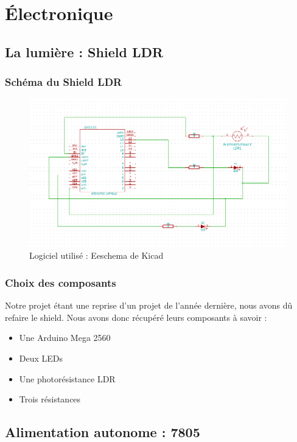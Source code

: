 \chapter{Électronique}
\section{La lumière : Shield LDR}
\subsection{Schéma du Shield LDR}
\begin{figure}[h]
	\centering
	\includegraphics[width=550px]{images/SchemaElectriqueShield.png}
	\caption{Logiciel utilisé : Eeschema de Kicad}
\end{figure}

\subsection{Choix des composants} 
	Notre projet étant une reprise d'un projet de l'année dernière, nous avons dû refaire le shield. Nous avons donc récupéré leurs composants à savoir :
	\begin{itemize}
		\item Une Arduino Mega 2560
		\item Deux LEDs 
		\item Une photorésistance LDR
		\item Trois résistances
	\end{itemize}

\section{Alimentation autonome : 7805}
